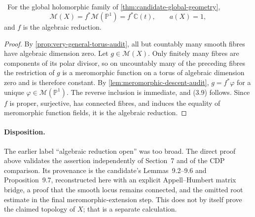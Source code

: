 \begin{theorem}
\label{thm:algebraic-dimension-audit}
\Verified\ For the global holomorphic family of
\cref{thm:candidate-global-geometry},
\[
 \mathcal M(X)=f^*\mathcal M(\mathbb P^1)=f^*\mathbb C(t),
 \qquad a(X)=1,
\tag{3.9}
\]
and \(f\) is the algebraic reduction.
\end{theorem}

\begin{proof}
By \cref{prop:very-general-torus-audit}, all but countably many smooth
fibres have algebraic dimension zero.  Let \(g\in\mathcal M(X)\).  Only
finitely many fibres are components of its polar divisor, so on uncountably
many of the preceding fibres the restriction of \(g\) is a meromorphic
function on a torus of algebraic dimension zero and is therefore constant.
By \cref{lem:meromorphic-descent-audit}, \(g=f^*\varphi\) for a unique
\(\varphi\in\mathcal M(\mathbb P^1)\).  The reverse inclusion is immediate,
and (3.9) follows.  Since \(f\) is proper, surjective, has connected fibres,
and induces the equality of meromorphic function fields, it is the algebraic
reduction.
\end{proof}

\paragraph{Disposition.}
The earlier label ``algebraic reduction open'' was too broad.  The direct
proof above validates the assertion independently of Section~7 and of the
CDP comparison.  Its provenance is the candidate's Lemmas~9.2--9.6 and
Proposition~9.7, reconstructed here with an explicit Appell--Humbert matrix
bridge, a proof that the smooth locus remains connected, and the omitted
root estimate in the final meromorphic-extension step.  This does not by
itself prove the claimed topology of \(X\); that is a separate calculation.
